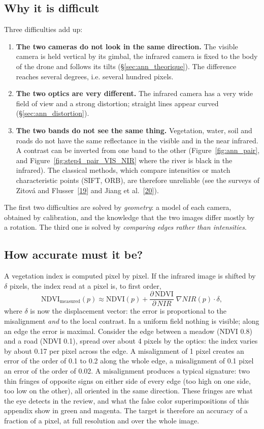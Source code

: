 \documentclass[a4paper,11pt]{report}
\begin{document}
\subsection{Why it is difficult}
Three difficulties add up:
\begin{enumerate}
	\item \textbf{The two cameras do not look in the same direction.} The visible camera is held vertical by its gimbal, the infrared camera is fixed to the body of the drone and follows its tilts (\S\ref{sec:ann_theorique}). The difference reaches several degrees, i.e. several hundred pixels.
	\item \textbf{The two optics are very different.} The infrared camera has a very wide field of view and a strong distortion; straight lines appear curved (\S\ref{sec:ann_distortion}).
	\item \textbf{The two bands do not see the same thing.} Vegetation, water, soil and roads do not have the same reflectance in the visible and in the near infrared. A contrast can be inverted from one band to the other (Figure~\ref{fig:ann_pair}, and Figure~\ref{fig:step4_pair_VIS_NIR} where the river is black in the infrared). The classical methods, which compare intensities or match characteristic points (SIFT, ORB), are therefore unreliable (see the surveys of Zitová and Flusser~[\hyperref[ann_zitova]{19}] and Jiang et al.~[\hyperref[ann_jiang]{20}]).
\end{enumerate}
The first two difficulties are solved by \emph{geometry}: a model of each camera, obtained by calibration, and the knowledge that the two images differ mostly by a rotation. The third one is solved by \emph{comparing edges rather than intensities}.

\subsection{How accurate must it be?}\label{sec:ann_accuracy}
A vegetation index is computed pixel by pixel. If the infrared image is shifted by $\delta$ pixels, the index read at a pixel is, to first order,
\begin{equation}
	\text{NDVI}_{\text{measured}}(p) \approx \text{NDVI}(p) + \frac{\partial\, \text{NDVI}}{\partial\, NIR}\; \nabla NIR(p) \cdot \delta,
\end{equation}
where $\delta$ is now the displacement vector: the error is proportional to the misalignment \emph{and} to the local contrast. In a uniform field nothing is visible; along an edge the error is maximal. Consider the edge between a meadow (NDVI 0.8) and a road (NDVI 0.1), spread over about 4 pixels by the optics: the index varies by about 0.17 per pixel across the edge. A misalignment of 1 pixel creates an error of the order of 0.1 to 0.2 along the whole edge, a misalignment of 0.1 pixel an error of the order of 0.02. A misalignment produces a typical signature: two thin fringes of opposite signs on either side of every edge (too high on one side, too low on the other), all oriented in the same direction. These fringes are what the eye detects in the review, and what the false color superimpositions of this appendix show in green and magenta. The target is therefore an accuracy of a fraction of a pixel, at full resolution and over the whole image.
\end{document}
